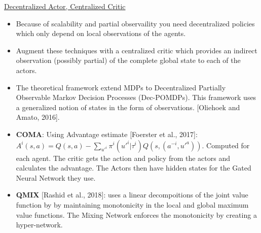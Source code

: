 \underline{Decentralized Actor, Centralized Critic}
\begin{itemize}[noitemsep,nolistsep]
	\item Because of scalability and partial observaility you need decentralized policies which only depend on local observations of the agents.
	\item Augment these techniques with a centralized critic which provides an indirect observation (possibly partial) of the complete global state to each of the actors. 
	\item The theoretical framework extend MDPs to Decentralized Partially Observable Markov Decision Processes (Dec-POMDPs). This framework uses a generalized notion of states in the form of observations. [Oliehoek and Amato, 2016].
	\item \textbf{COMA}: Using Advantage estimate [Foerster et al., 2017]: $A^i(s,a) = Q(s,a) - \sum_{u'^i} \pi^i (u'^i | \tau^i) Q(s,(a^{-i}, u'^a))$. Computed for each agent. The critic gets the action and policy from the actors and calculates the advantage. The Actors then have hidden states for the Gated Neural Network they use.
	\item \textbf{QMIX} [Rashid et al., 2018]: uses a linear decompoitions of the joint value function by by maintaining monotonicity in the local and global maximum value functions. The Mixing Network enforces the monotonicity by creating a hyper-network.
\end{itemize}

